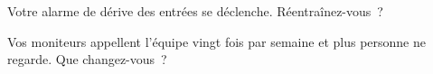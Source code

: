 \begin{interviewq}\label{iq:ml:monitoring-and-retraining:5}
Votre alarme de dérive des entrées se déclenche. Réentraînez-vous~?
\end{interviewq}

\begin{interviewq}\label{iq:ml:monitoring-and-retraining:6}
Vos moniteurs appellent l'équipe vingt fois par semaine et plus personne ne regarde. Que changez-vous~?
\end{interviewq}
